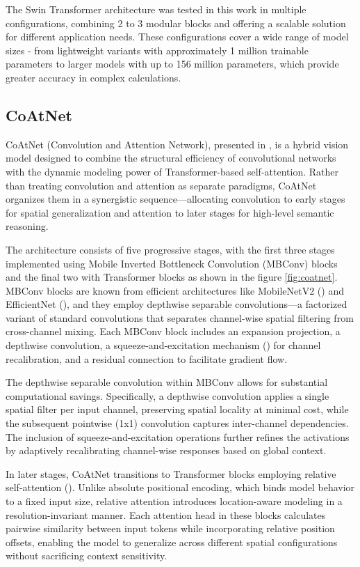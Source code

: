 \documentclass[a4paper,11pt,twoside]{report}
\theoremstyle{definition}
\begin{document}
The Swin Transformer architecture was tested in this work in multiple configurations, combining 2 to 3 modular blocks and offering a scalable solution for different application needs. These configurations cover a wide range of model sizes - from lightweight variants with approximately 1 million trainable parameters to larger models with up to 156 million parameters, which provide greater accuracy in complex calculations.

\subsection{CoAtNet}

CoAtNet (Convolution and Attention Network), presented in \cite{coatnet}, is a hybrid vision model designed to combine the structural efficiency of convolutional networks with the dynamic modeling power of Transformer-based self-attention. Rather than treating convolution and attention as separate paradigms, CoAtNet organizes them in a synergistic sequence—allocating convolution to early stages for spatial generalization and attention to later stages for high-level semantic reasoning.

The architecture consists of five progressive stages, with the first three stages implemented using Mobile Inverted Bottleneck Convolution (MBConv) blocks and the final two with Transformer blocks as shown in the figure \ref{fig:coatnet}. MBConv blocks are known from efficient architectures like MobileNetV2 (\cite{mobilenetv2}) and EfficientNet (\cite{efficientnet}), and they employ depthwise separable convolutions—a factorized variant of standard convolutions that separates channel-wise spatial filtering from cross-channel mixing. Each MBConv block includes an expansion projection, a depthwise convolution, a squeeze-and-excitation mechanism (\cite{squeeze}) for channel recalibration, and a residual connection to facilitate gradient flow.


The depthwise separable convolution within MBConv allows for substantial computational savings. Specifically, a depthwise convolution applies a single spatial filter per input channel, preserving spatial locality at minimal cost, while the subsequent pointwise (1x1) convolution captures inter-channel dependencies. The inclusion of squeeze-and-excitation operations further refines the activations by adaptively recalibrating channel-wise responses based on global context.

In later stages, CoAtNet transitions to Transformer blocks employing relative self-attention (\cite{relation}). Unlike absolute positional encoding, which binds model behavior to a fixed input size, relative attention introduces location-aware modeling in a resolution-invariant manner. Each attention head in these blocks calculates pairwise similarity between input tokens while incorporating relative position offsets, enabling the model to generalize across different spatial configurations without sacrificing context sensitivity.
\end{document}
